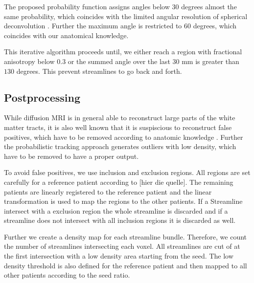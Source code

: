 The proposed probability function assigns angles below 30 degrees almost the
same probability, which coincides with the limited angular resolution of
spherical deconvolution \cite{TOURNIER20071459}. Further the maximum angle is
restricted to 60 degrees, which coincides with our anatomical knowledge.

This iterative algorithm proceeds until, we either reach a region with fractional
anisotropy below $0.3$ or the summed angle over the last $30$ mm is greater than
$130$ degrees. This prevent streamlines to go back and forth. 

\subsection{Postprocessing}
While diffusion MRI is in general able to reconstruct large parts of the white
matter tracts, it is also well known that it is suspiscious to reconstruct false
positives, which have to be removed according to anatomic knowledge
\cite{Wakana:2007, MaierHein:2017}. Further the probabilistic tracking approach
generates outliers with low density, which have to be removed to have a proper
output. 

To avoid false positives, we use inclusion and exclusion regions. All regions
are set carefully for a reference patient according to [hier die quelle].
The remaining patients are linearly registered to the reference patient and the
linear transformation is used to map the regions to the other patients. 
If a Streamline intersect with a exclusion region the whole streamline is
discarded and if a streamline does not intersect with all inclusion regions it
is discarded as well. 

Further we create a density map for each streamline
bundle. Therefore, we count the number of streamlines intersecting each voxel.
All streamlines are cut of at the first intersection with a low density
area starting from the seed. The low density threshold is also defined for the
reference patient and then mapped to all other patients according to the seed
ratio.
